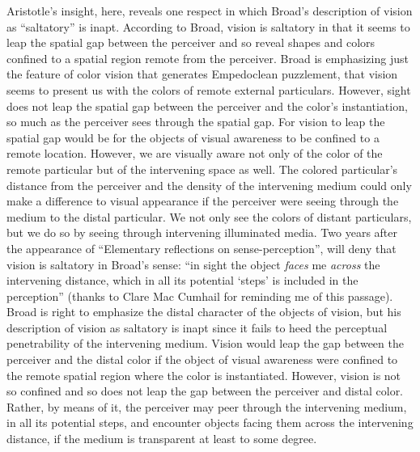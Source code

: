\documentclass[12pt]{article}
\begin{document}
Aristotle's insight, here, reveals one respect in which Broad's \citeyearpar{Broad:1952kx} description of vision as ``saltatory'' is inapt. According to Broad, vision is saltatory in that it seems to leap the spatial gap between the perceiver and so reveal shapes and colors confined to a spatial region remote from the perceiver. Broad is emphasizing just the feature of color vision that generates Empedoclean puzzlement, that vision seems to present us with the colors of remote external particulars. However, sight does not leap the spatial gap between the perceiver and the color's instantiation, so much as the perceiver sees through the spatial gap. For vision to leap the spatial gap would be for the objects of visual awareness to be confined to a remote location. However, we are visually aware not only of the color of the remote particular but of the intervening space as well. The colored particular's distance from the perceiver and the density of the intervening medium could only make a difference to visual appearance if the perceiver were seeing through the medium to the distal particular. We not only see the colors of distant particulars, but we do so by seeing through intervening illuminated media. Two years after the appearance of ``Elementary reflections on sense-perception'', \citet[518]{Jonas:1954aa} will deny that vision is saltatory in Broad's sense: ``in sight the object \emph{faces} me \emph{across} the intervening distance, which in all its potential `steps' is included in the perception'' (thanks to Clare Mac Cumhail for reminding me of this passage). Broad is right to emphasize the distal character of the objects of vision, but his description of vision as saltatory is inapt since it fails to heed the perceptual penetrability of the intervening medium. Vision would leap the gap between the perceiver and the distal color if the object of visual awareness were confined to the remote spatial region where the color is instantiated. However, vision is not so confined and so does not leap the gap between the perceiver and distal color. Rather, by means of it, the perceiver may peer through the intervening medium, in all its potential steps, and encounter objects facing them across the intervening distance, if the medium is transparent at least to some degree.
\end{document}
